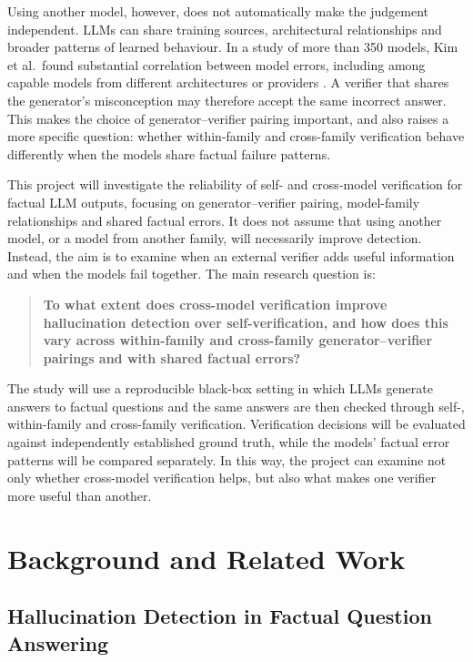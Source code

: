 \documentclass[11pt,a4paper]{article}
\begin{document}
	Using another model, however, does not automatically make the judgement independent. LLMs can share training sources, architectural relationships and broader patterns of learned behaviour. In a study of more than 350 models, Kim et al.\ found substantial correlation between model errors, including among capable models from different architectures or providers \cite{kim2025correlated}. A verifier that shares the generator's misconception may therefore accept the same incorrect answer. This makes the choice of generator--verifier pairing important, and also raises a more specific question: whether within-family and cross-family verification behave differently when the models share factual failure patterns.
	
	This project will investigate the reliability of self- and cross-model verification for factual LLM outputs, focusing on generator--verifier pairing, model-family relationships and shared factual errors. It does not assume that using another model, or a model from another family, will necessarily improve detection. Instead, the aim is to examine when an external verifier adds useful information and when the models fail together. The main research question is:
	
	\begin{quote}
		\textbf{To what extent does cross-model verification improve hallucination detection over self-verification, and how does this vary across within-family and cross-family generator--verifier pairings and with shared factual errors?}
	\end{quote}
	
	The study will use a reproducible black-box setting in which LLMs generate answers to factual questions and the same answers are then checked through self-, within-family and cross-family verification. Verification decisions will be evaluated against independently established ground truth, while the models' factual error patterns will be compared separately. In this way, the project can examine not only whether cross-model verification helps, but also what makes one verifier more useful than another.  
	
	\section{Background and Related Work}
	
	\subsection{Hallucination Detection in Factual Question Answering}
	
\end{document}
